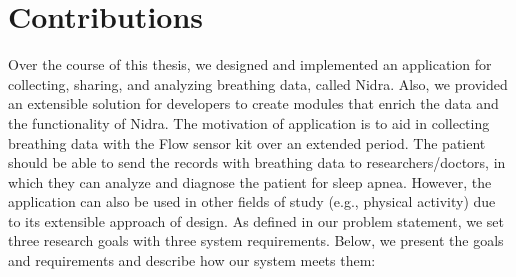 \section{Contributions}
Over the course of this thesis, we designed and implemented an application for collecting, sharing, and analyzing breathing data, called Nidra. Also, we provided an extensible solution for developers to create modules that enrich the data and the functionality of Nidra. The motivation of application is to aid in collecting breathing data with the Flow sensor kit over an extended period. The patient should be able to send the records with breathing data to researchers/doctors, in which they can analyze and diagnose the patient for sleep apnea. However, the application can also be used in other fields of study (e.g., physical activity)  due to its extensible approach of design. As defined in our problem statement, we set three research goals with three system requirements. Below, we present the goals and requirements and describe how our system meets them:

